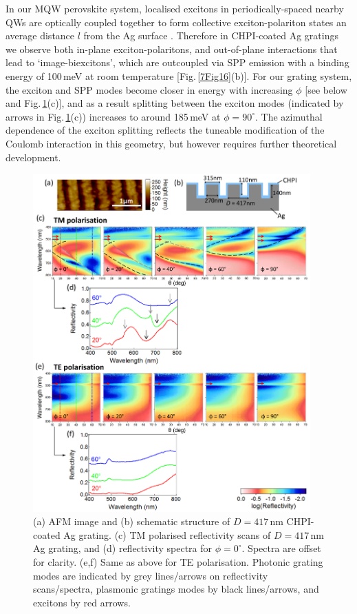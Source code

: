 In our MQW perovskite system, localised excitons in periodically-spaced nearby QWs are optically coupled together to form collective exciton-polariton states an average distance $l$ from the Ag surface \cite{Pbbr2008, Baumberg1998, Kavokin1998, Vladimirova1998}. Therefore in CHPI-coated Ag gratings we observe both in-plane exciton-polaritons, and out-of-plane interactions that lead to `image-biexcitons', which are outcoupled via SPP emission with a binding energy of 100\,meV at room temperature [Fig.\,\ref{7Fig16}(b)]. For our grating system, the exciton and SPP modes become closer in energy with increasing $\phi$ [see below and Fig.\,\ref{7Fig17}(c)], and as a result splitting between the exciton modes (indicated by arrows in Fig.\,\ref{7Fig17}(c)) increases to around 185\,meV at $\phi=90^{\circ}$. The azimuthal dependence of the exciton splitting reflects the tuneable modification of the Coulomb interaction in this geometry, but however requires further theoretical development.

\begin{figure}[h!] 
\centering    
\includegraphics[width=0.95\textwidth]{Fig17}
\caption[(a) AFM image and (b) schematic structure of $D=417$\,nm CHPI-coated Ag grating. Reflectivity measurements of CHPI-coated Ag grating in (c,d) TM and (e.f) TE polarisation.]{(a) AFM image and (b) schematic structure of $D=417$\,nm CHPI-coated Ag grating. (c) TM polarised reflectivity scans of $D=417$\,nm Ag grating, and (d) reflectivity spectra for $\phi=0^{\circ}$. Spectra are offset for clarity. (e,f) Same as above for TE polarisation. Photonic grating modes are indicated by grey lines/arrows on reflectivity scans/spectra, plasmonic gratings modes by black lines/arrows, and excitons by red arrows.}
\label{7Fig17}
\end{figure}

